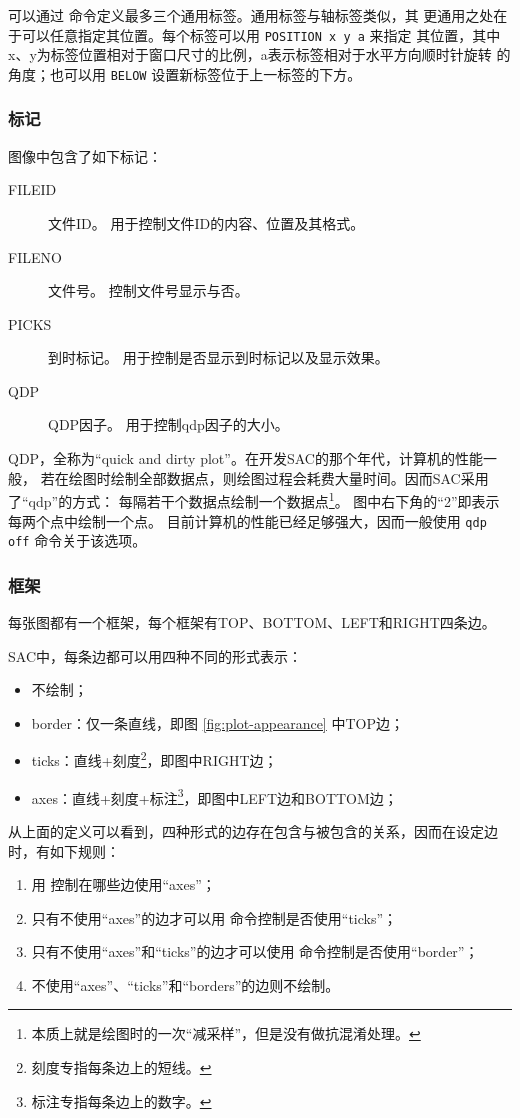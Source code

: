 可以通过  命令定义最多三个通用标签。通用标签与轴标签类似，其
更通用之处在于可以任意指定其位置。每个标签可以用 \texttt{POSITION x y a} 来指定
其位置，其中x、y为标签位置相对于窗口尺寸的比例，a表示标签相对于水平方向顺时针旋转
的角度；也可以用 \texttt{BELOW} 设置新标签位于上一标签的下方。

\subsubsection{标记}
图像中包含了如下标记：
\begin{description}
\item [FILEID] 文件ID。 用于控制文件ID的内容、位置及其格式。
\item [FILENO] 文件号。 控制文件号显示与否。
\item [PICKS] 到时标记。 用于控制是否显示到时标记以及显示效果。
\item [QDP] QDP因子。 用于控制qdp因子的大小。
\end{description}

QDP，全称为``quick and dirty plot''。在开发SAC的那个年代，计算机的性能一般，
若在绘图时绘制全部数据点，则绘图过程会耗费大量时间。因而SAC采用了``qdp''的方式：
每隔若干个数据点绘制一个数据点\footnote{本质上就是绘图时的一次``减采样''，但是没有做抗混淆处理。}。
图中右下角的``2''即表示每两个点中绘制一个点。
目前计算机的性能已经足够强大，因而一般使用 \texttt{qdp off} 命令关于该选项。

\subsubsection{框架}
每张图都有一个框架，每个框架有TOP、BOTTOM、LEFT和RIGHT四条边。

SAC中，每条边都可以用四种不同的形式表示：
\begin{itemize}
\item 不绘制；
\item border：仅一条直线，即图 \ref{fig:plot-appearance} 中TOP边；
\item ticks：直线+刻度\footnote{刻度专指每条边上的短线。}，即图中RIGHT边；
\item axes：直线+刻度+标注\footnote{标注专指每条边上的数字。}，即图中LEFT边和BOTTOM边；
\end{itemize}

从上面的定义可以看到，四种形式的边存在包含与被包含的关系，因而在设定边时，有如下规则：
\begin{enumerate}
\item 用  控制在哪些边使用``axes''；
\item 只有不使用``axes''的边才可以用  命令控制是否使用``ticks''；
\item 只有不使用``axes''和``ticks''的边才可以使用  命令控制是否使用``border''；
\item 不使用``axes''、``ticks''和``borders''的边则不绘制。
\end{enumerate}

